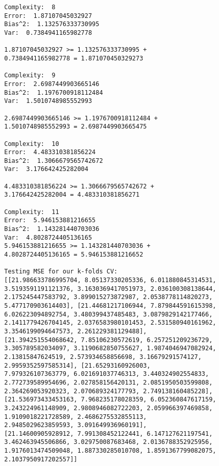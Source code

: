 \begin{verbatim}
        Complexity:  8
        Error:  1.87107045032927
        Bias^2:  1.132576333730995
        Var:  0.7384941165982778
        
        1.87107045032927 >= 1.132576333730995 + 
        0.7384941165982778 = 1.871070450329273
        
        Complexity:  9
        Error:  2.6987449903665146
        Bias^2:  1.1976700918112484
        Var:  1.5010748985552993
        
        2.6987449903665146 >= 1.1976700918112484 +
        1.5010748985552993 = 2.6987449903665475
        
        Complexity:  10
        Error:  4.483310381856224
        Bias^2:  1.3066679565742672
        Var:  3.176642425282004
        
        4.483310381856224 >= 1.3066679565742672 +
        3.176642425282004 = 4.483310381856271
        
        Complexity:  11
        Error:  5.946153881216655
        Bias^2:  1.143281440703036
        Var:  4.8028724405136165
        5.946153881216655 >= 1.143281440703036 +
        4.8028724405136165 = 5.946153881216652
        
        Testing MSE for our k-folds CV:  
        [[21.986633786995704, 8.05137330205336, 6.011880845314531,
        3.5193591191121376, 3.1630369417051973, 2.036100308138644,
        2.175245447583792, 3.899015273872987, 2.0538778114820273,
        5.477170903614403], [21.44681217106944, 7.879844591615398,
        6.026223094892754, 3.480399437485483, 3.0879829142177466,
        2.1411779426704145, 2.0376583980101453, 2.531580940161962,
        3.3546199094647573, 2.261229381129488],
        [21.394251554068642, 7.85106230572619, 6.257251209236729,
        3.305789582034097, 3.1190682850755627, 1.9874046947082924,
        2.13815847624519, 2.573934658856698, 3.16679291574127,
        2.9959352597585314], [21.65293160926003,
        7.979326107363779, 6.021691037746313, 3.440324902554833,
        2.772739589954696, 2.027858156420131, 2.0851950503599808,
        2.364269053920323, 2.070689324177793, 2.749138160485228],
        [21.536973433453163, 7.968235178028359, 6.052360847617159,
        3.243224961148909, 2.9808946082722203, 2.059966397469858,
        1.9109018221728589, 2.4686275532855113,
        2.9485029623859593, 3.091649936960191],
        [21.14600905928912, 7.991308452122441, 6.147127621197541,
        3.462463945506866, 3.029750087683468, 2.0136788352925956,
        1.9176013474509048, 1.887330285010708, 1.8591367799082075,
        2.1037950917202557]]
        

\end{verbatim}
